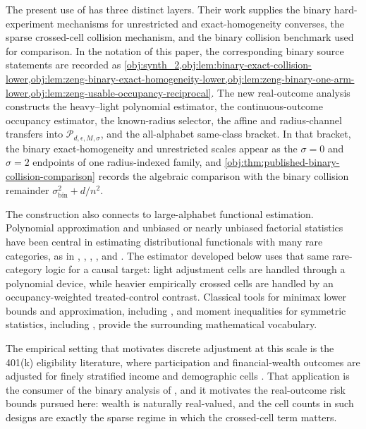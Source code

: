 The present use of \citet{ZengBalakrishnanHanKennedy2024} has three distinct layers. Their work supplies the binary hard-experiment mechanisms for unrestricted and exact-homogeneity converses, the sparse crossed-cell collision mechanism, and the binary collision benchmark used for comparison. In the notation of this paper, the corresponding binary source statements are recorded as \cref{obj:synth_2,obj:lem:binary-exact-collision-lower,obj:lem:zeng-binary-exact-homogeneity-lower,obj:lem:zeng-binary-one-arm-lower,obj:lem:zeng-usable-occupancy-reciprocal}. The new real-outcome analysis constructs the heavy--light polynomial estimator, the continuous-outcome occupancy estimator, the known-radius selector, the affine and radius-channel transfers into \(\mathcal P_{d,\epsilon,M,\sigma}\), and the all-alphabet same-class bracket. In that bracket, the binary exact-homogeneity and unrestricted scales appear as the \(\sigma=0\) and \(\sigma=2\) endpoints of one radius-indexed family, and \cref{obj:thm:published-binary-collision-comparison} records the algebraic comparison with the binary collision remainder \(\sigma_{\mathrm{bin}}^2+d/n^2\).

The construction also connects to large-alphabet functional estimation. Polynomial approximation and unbiased or nearly unbiased factorial statistics have been central in estimating distributional functionals with many rare categories, as in \citet{Paninski2003}, \citet{Valiant2011a,Valiant2011b,Valiant2016,Valiant2017}, \citet{JiaoVenkatHanWeissman2015}, \citet{WuYang2016Entropy}, and \citet{Wu2019}. The estimator developed below uses that same rare-category logic for a causal target: light adjustment cells are handled through a polynomial device, while heavier empirically crossed cells are handled by an occupancy-weighted treated-control contrast. Classical tools for minimax lower bounds and approximation, including \citet{LeCam1986,Tsybakov2009,Cai2011,Donoho1990,Timan1963}, and moment inequalities for symmetric statistics, including \citet{Hoeffding1948,Serfling1980}, provide the surrounding mathematical vocabulary.

The empirical setting that motivates discrete adjustment at this scale is the 401(k) eligibility literature, where participation and financial-wealth outcomes are adjusted for finely stratified income and demographic cells \citep{Poterba1994,Poterba1995}. That application is the consumer of the binary analysis of \citet{ZengBalakrishnanHanKennedy2024}, and it motivates the real-outcome risk bounds pursued here: wealth is naturally real-valued, and the cell counts in such designs are exactly the sparse regime in which the crossed-cell term matters.

